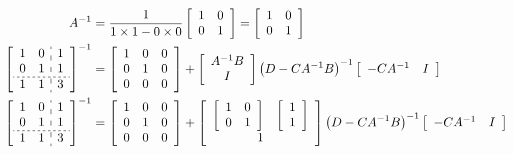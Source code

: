 \documentclass[12pt,a4paper]{paper}
\begin{document}
\begin{enumerate}
\begin{enumerate}
\begin{align*}
%
A^{-1} &= \frac{1}{1 \times 1 - 0 \times 0}\left[\begin{array}{cc}1 & 0\\0 & 1\end{array}\right] = \left[\begin{array}{cc}1 & 0\\0 & 1\end{array}\right]\\
%
\left[\begin{array}{cc:c}1&0&1\\0&1&1\\\hdashline[2pt/2pt]1&1&3\end{array}\right]^{-1} &= \left[\begin{array}{ccc}1&0&0\\0&1&0\\0&0&0\end{array}\right] + \left[\begin{array}{c}A^{-1}B\\I\end{array}\right]\left(D-CA^{-1}B\right)^{-1}\left[\begin{array}{cc}-CA^{-1}&I\end{array}\right]\\
%
\left[\begin{array}{cc:c}1&0&1\\0&1&1\\\hdashline[2pt/2pt]1&1&3\end{array}\right]^{-1} &= \left[\begin{array}{ccc}1&0&0\\0&1&0\\0&0&0\end{array}\right] + \left[\begin{array}{cc}\left[\begin{array}{cc}1 & 0\\0 & 1\end{array}\right]&\left[\begin{array}{c}1\\1\end{array}\right]\\\multicolumn{2}{c}{1}\end{array}\right]\left(D-CA^{-1}B\right)^{-1}\left[\begin{array}{cc}-CA^{-1}&I\end{array}\right]\\
%

\end{align*}
\end{enumerate}
\end{enumerate}
\end{document}
